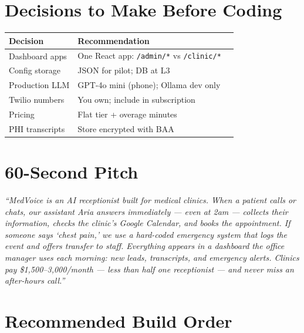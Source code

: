 \documentclass[11pt,a4paper]{article}
\begin{document}
\section{Decisions to Make Before Coding}

\begin{center}
\small
\begin{tabular}{@{}lll@{}}
\toprule
\textbf{Decision} & \textbf{Recommendation} \\
\midrule
Dashboard apps & One React app: \texttt{/admin/*} vs \texttt{/clinic/*} \\
Config storage & JSON for pilot; DB at L3 \\
Production LLM & GPT-4o mini (phone); Ollama dev only \\
Twilio numbers & You own; include in subscription \\
Pricing & Flat tier + overage minutes \\
PHI transcripts & Store encrypted with BAA \\
\bottomrule
\end{tabular}
\end{center}

\section{60-Second Pitch}

\emph{``MedVoice is an AI receptionist built for medical clinics. When a patient calls or chats, our assistant Aria answers immediately --- even at 2am --- collects their information, checks the clinic's Google Calendar, and books the appointment. If someone says `chest pain,' we use a hard-coded emergency system that logs the event and offers transfer to staff. Everything appears in a dashboard the office manager uses each morning: new leads, transcripts, and emergency alerts. Clinics pay \$1,500--3,000/month --- less than half one receptionist --- and never miss an after-hours call.''}

\section{Recommended Build Order}

\begin{center}
\end{center}
\end{document}
